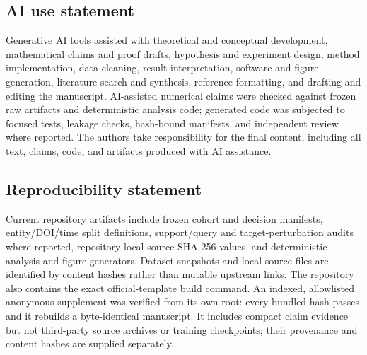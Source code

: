 \subsection*{AI use statement}

Generative AI tools assisted with theoretical and conceptual development,
mathematical claims and proof drafts, hypothesis and experiment design, method
implementation, data cleaning, result interpretation, software and figure
generation, literature search and synthesis, reference formatting, and drafting
and editing the manuscript.  AI-assisted numerical claims were checked against
frozen raw artifacts and deterministic analysis code; generated code was
subjected to focused tests, leakage checks, hash-bound manifests, and independent
review where reported.  The authors take responsibility for the final content,
including all text, claims, code, and artifacts produced with AI assistance.

\subsection*{Reproducibility statement}

Current repository artifacts include frozen cohort and decision manifests,
entity/DOI/time split definitions, support/query and target-perturbation audits
where reported, repository-local source SHA-256 values, and deterministic
analysis and figure generators.  Dataset snapshots and local source files are
identified by content hashes rather than mutable upstream links.  The
repository also contains the exact official-template build command.  An indexed,
allowlisted anonymous supplement was verified from its own root: every bundled
hash passes and it rebuilds a byte-identical manuscript.  It includes compact
claim evidence but not third-party source archives or training checkpoints;
their provenance and content hashes are supplied separately.
